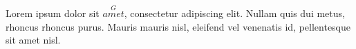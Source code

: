 \documentclass{article}
\begin{document}
Lorem ipsum dolor sit $\overset{G}{amet}$, consectetur adipiscing elit.
Nullam quis dui metus, rhoncus rhoncus purus. Mauris mauris nisl,
eleifend vel venenatis id, pellentesque sit amet nisl.
\end{document}
